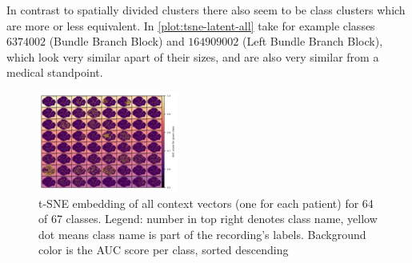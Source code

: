 In contrast to spatially divided clusters there also seem to be class clusters which are more or less equivalent. In \autoref{plot:tsne-latent-all} take for example classes $6374002$ (Bundle Branch Block) and $164909002$ (Left Bundle Branch Block), which look very similar apart of their sizes, and are also very similar from a medical standpoint.
\begin{figure}[H]
	\includegraphics[height=\linewidth, angle=90]{bilder/tsne-context-all(ordered by auc).png}
	\caption[Two dimensional t-SNE embeddings of all context vectors]{t-SNE embedding of all context vectors (one for each patient) for 64 of 67 classes. Legend: number in top right denotes class name, yellow dot means class name is part of the recording's labels. Background color is the AUC score per class, sorted descending}
	\label{plot:tsne-context-all}
\end{figure}
